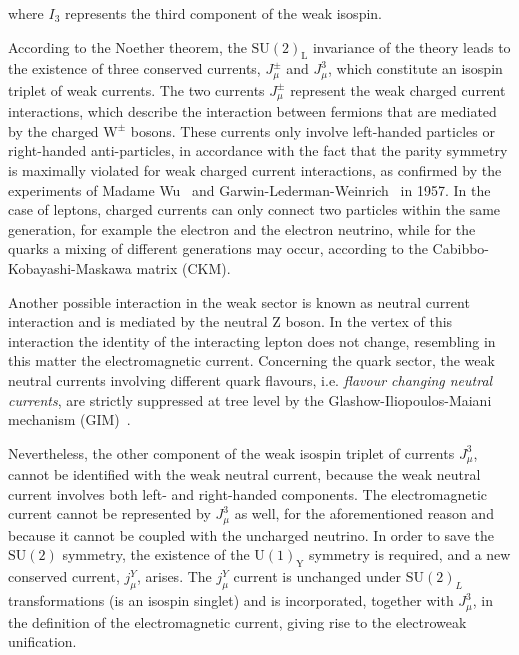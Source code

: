 \noindent where $I_3$ represents the third component of the weak isospin. 

According to the Noether theorem, the $\mathrm{SU(2)_L}$ invariance of the theory leads to the existence of three conserved currents, $J_\mu^\pm$ and $J_\mu^3$, which constitute an isospin triplet of weak currents. 
The two currents $J_\mu^\pm$ represent the weak charged current interactions, which describe the interaction between fermions that are mediated by the charged $\mathrm{W^\pm}$ bosons. These currents only involve left-handed particles or right-handed anti-particles, in accordance with the fact that the parity symmetry is maximally violated for weak charged current interactions, as confirmed by the experiments of Madame Wu~\cite{Wu:1957my} and Garwin-Lederman-Weinrich~\cite{Garwin:1957hc} in 1957. In the case of leptons, charged currents can only connect two particles within the same generation, for example the electron and the electron neutrino, while for the quarks a mixing of different generations may occur, according to the Cabibbo-Kobayashi-Maskawa matrix (CKM).

Another possible interaction in the weak sector is known as neutral current interaction and is mediated by the neutral Z boson. In the vertex of this interaction the identity of the interacting lepton does not change, resembling in this matter the electromagnetic current. Concerning the quark sector, the weak neutral currents involving different quark flavours, i.e. \emph{flavour changing neutral currents}, are strictly suppressed at tree level by the Glashow-Iliopoulos-Maiani mechanism (GIM)~\cite{Glashow:1970gm}.

Nevertheless, the other component of the weak isospin triplet of currents $J_\mu^3$, cannot be identified with the weak neutral current, because the weak neutral current involves both left- and right-handed components. The electromagnetic current cannot be represented by $J_\mu^3$ as well, for the aforementioned reason and because it cannot be coupled with the uncharged neutrino. In order to save the $\mathrm{SU(2)}$ symmetry, the existence of the $\mathrm{U(1)_Y}$ symmetry is required, and a new conserved current, $j_\mu^Y$, arises. The $j_\mu^Y$ current is unchanged under $\mathrm{SU(2)}_L$ transformations (is an isospin singlet) and is incorporated, together with $J_\mu^3$, in the definition of the electromagnetic current, giving rise to the electroweak unification.

